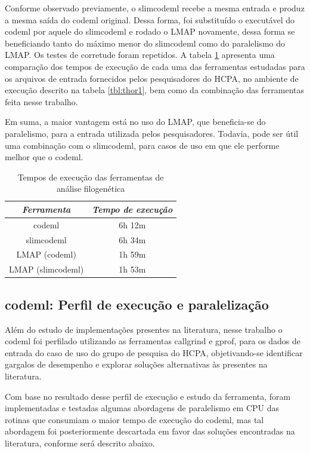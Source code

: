 \documentclass[cic,tc]{iiufrgs}
\begin{document}
Conforme observado previamente, o slimcodeml recebe a mesma entrada e produz a
mesma saída do codeml original. Dessa forma, foi substituído o executável do
codeml por aquele do slimcodeml e rodado o LMAP novamente, dessa forma se
beneficiando tanto do máximo menor do slimcodeml como do paralelismo do LMAP.
Os testes de corretude foram repetidos. A tabela \ref{tbl:paml} apresenta uma
comparação dos tempos de execução de cada uma das ferramentas estudadas para os
arquivos de entrada fornecidos pelos pesquisadores do HCPA, no ambiente de
execução descrito na tabela \ref{tbl:thor1}, bem como da combinação das
ferramentas feita nesse trabalho. 

Em suma, a maior vantagem está no uso do LMAP, que beneficia-se do paralelismo,
para a entrada utilizada pelos pesquisadores. Todavia, pode ser útil uma
combinação com o slimcodeml, para casos de uso em que ele performe melhor que o
codeml. 

\begin{table}[h]
    \caption{Tempos de execução das ferramentas de análise filogenética}
    \centering
        \begin{tabular}{c|c}
          \hline
          \textit{Ferramenta}  &   \textit{Tempo de execução} \\
          \hline
          \hline
          codeml & 6h 12m \\
          slimcodeml & 6h 34m \\
          LMAP (codeml) & 1h 59m \\
          LMAP (slimcodeml) & 1h 53m \\
          \hline
        \end{tabular}
    \label{tbl:paml}
\end{table}

\subsection{codeml: Perfil de execução e paralelização}
\label{subsec:codemlpar}

Além do estudo de implementações presentes na literatura, nesse trabalho o
codeml foi perfilado utilizando as ferramentas callgrind e gprof, para os dados
de entrada do caso de uso do grupo de pesquisa do HCPA, objetivando-se
identificar gargalos de desempenho e explorar soluções alternativas às
presentes na literatura.

Com base no resultado desse perfil de execução e estudo da ferramenta, foram
implementadas e testadas algumas abordagens de paralelismo em CPU das rotinas
que consumiam o maior tempo de execução do codeml, mas tal abordagem foi
posteriormente descartada em favor das soluções encontradas na literatura,
conforme será descrito abaixo. 
\end{document}
